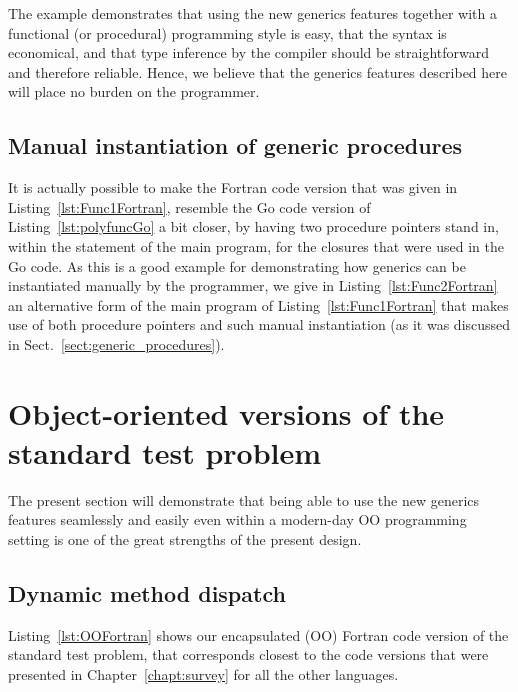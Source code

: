 \documentclass[11pt,oneside]{report}
\newcommand{\code}[1]{{\selectfont\ttfamily{#1}}}
\begin{document}
The example demonstrates that using the new generics features together
with a functional (or procedural) programming style is easy, that the
syntax is economical, and that type inference by the compiler should
be straightforward and therefore reliable. Hence, we believe that the
generics features described here will place no burden on the
programmer.


\subsection{Manual instantiation of generic procedures}

It is actually possible to make the Fortran code version that was
given in Listing~\ref{lst:Func1Fortran}, resemble the Go code version
of Listing~\ref{lst:polyfuncGo} a bit closer, by having two procedure
pointers stand in, within the \code{select case} statement of the main
program, for the closures that were used in the Go code. As this is a
good example for demonstrating how generics can be instantiated
manually by the programmer, we give in Listing~\ref{lst:Func2Fortran}
an alternative form of the main program of
Listing~\ref{lst:Func1Fortran} that makes use of both procedure
pointers and such manual instantiation (as it was discussed in
Sect.~\ref{sect:generic_procedures}).




\section{Object-oriented versions of the standard test problem}

The present section will demonstrate that being able to use the new
generics features seamlessly and easily even within a modern-day OO
programming setting is one of the great strengths of the present
design.

\subsection{Dynamic method dispatch}
\label{sect:Fortran_dynamic_dispatch}

Listing~\ref{lst:OOFortran} shows our encapsulated (OO) Fortran code
version of the standard test problem, that corresponds closest to the
code versions that were presented in Chapter~\ref{chapt:survey} for
all the other languages.
\end{document}
